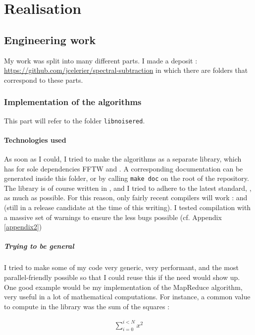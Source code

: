 \section{Realisation}
\subsection{Engineering work}
My work was split into many different parts. I made a  deposit : \url{https://github.com/jcelerier/spectral-subtraction} in which there are folders that correspond to these parts.

\subsubsection{Implementation of the algorithms}
This part will refer to the folder \texttt{libnoisered}. 

\paragraph{Technologies used}
As soon as I could, I tried to make the algorithms as a separate library, which has for sole dependencies \ac{FFTW} and . A corresponding  documentation can be generated inside this folder, or by calling \texttt{make doc} on the root of the repository.
The library is of course written in , and I tried to adhere to the latest standard, , as much as possible. For this reason, only fairly recent compilers will work :  and  (still in a release candidate at the time of this writing).
I tested compilation with a massive set of warnings to ensure the less bugs possible (cf. Appendix \ref{appendix2})

\subparagraph{Trying to be general}
I tried to make some of my code very generic, very performant, and the most parallel-friendly possible so that I could reuse this if the need would show up.
One good example would be my implementation of the MapReduce algorithm, very useful in a lot of mathematical computations.
For instance, a common value to compute in the library was the sum of the squares : 

\begin{align*}
\displaystyle\sum_{\displaystyle i=0}^{\displaystyle i<N} \displaystyle x^2
\end{align*}

